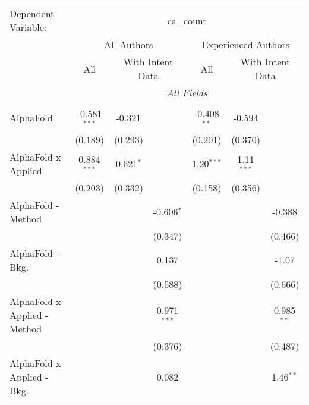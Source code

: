 \begingroup
\centering
\begin{tabular}{lcccccc}
   \tabularnewline \midrule \midrule
   Dependent Variable: & \multicolumn{6}{c}{ca\_count}\\
 & \multicolumn{3}{c}{All Authors} & \multicolumn{3}{c}{Experienced Authors} \\
\cmidrule(lr){2-4} \cmidrule(lr){5-7}
 & \multicolumn{1}{c}{All} & \multicolumn{2}{c}{With Intent Data} & \multicolumn{1}{c}{All} & \multicolumn{2}{c}{With Intent Data} \\
\cmidrule(lr){2-2} \cmidrule(lr){3-4} \cmidrule(lr){5-5} \cmidrule(lr){6-7}
 & \multicolumn{6}{c}{\textit{All Fields}} \\ \\
   AlphaFold                      & -0.581$^{***}$ & -0.321        &               & -0.408$^{**}$ & -0.594        &   \\   
                                  & (0.189)        & (0.293)       &               & (0.201)       & (0.370)       &   \\   
   AlphaFold x Applied            & 0.884$^{***}$  & 0.621$^{*}$   &               & 1.20$^{***}$  & 1.11$^{***}$  &   \\   
                                  & (0.203)        & (0.332)       &               & (0.158)       & (0.356)       &   \\   
   AlphaFold - Method             &                &               & -0.606$^{*}$  &               &               & -0.388\\   
                                  &                &               & (0.347)       &               &               & (0.466)\\   
   AlphaFold - Bkg.               &                &               & 0.137         &               &               & -1.07\\   
                                  &                &               & (0.588)       &               &               & (0.666)\\   
   AlphaFold x Applied - Method   &                &               & 0.971$^{***}$ &               &               & 0.985$^{**}$\\   
                                  &                &               & (0.376)       &               &               & (0.487)\\   
   AlphaFold x Applied - Bkg.     &                &               & 0.082         &               &               & 1.46$^{**}$\\   

\end{tabular}
